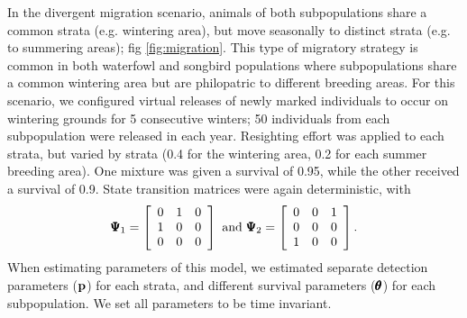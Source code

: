 \documentclass[times,mee,doublespace,]{besauth2}
\begin{document}
In the divergent migration scenario, animals of both subpopulations share a common strata (e.g. wintering area), but move seasonally to distinct strata (e.g. to summering areas); fig \ref{fig:migration}. This type of migratory strategy is common in both waterfowl and songbird populations where subpopulations share a common wintering area but are philopatric to different breeding areas.  For this scenario, we configured virtual releases of newly marked individuals to occur on wintering grounds for 5 consecutive winters; 50 individuals from each subpopulation were released in each year.  Resighting effort was applied to each strata, but varied by strata (0.4 for the wintering area, 0.2 for each summer breeding area).  One mixture was given a survival of 0.95, while the other received a survival of 0.9.  State transition matrices were again deterministic, with 
\begin{eqnarray*}
  \pmb{\Psi}_1 = \left[ \begin{array}{ccc} 0 & 1 & 0 \\ 1 & 0 & 0 \\ 0 & 0 & 0 \end{array} \right]
  \text{  and  } \pmb{\Psi}_2 = \left[ \begin{array}{ccc} 0 & 0 & 1 \\ 0 & 0 & 0 \\ 1 & 0 & 0 \end{array} \right].
\end{eqnarray*}
When estimating parameters of this model, we estimated separate detection parameters (${\bf p}$) for each strata, and different survival parameters ($\pmb{\theta}$) for each subpopulation.  We set all parameters to be time invariant.
\end{document}
